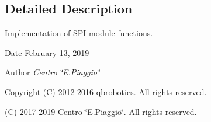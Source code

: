 \subsection{Detailed Description}
Implementation of S\+PI module functions. 

\begin{DoxyDate}{Date}
February 13, 2019 
\end{DoxyDate}
\begin{DoxyAuthor}{Author}
{\itshape Centro \char`\"{}\+E.\+Piaggio\char`\"{}} 
\end{DoxyAuthor}
\begin{DoxyCopyright}{Copyright}
(C) 2012-\/2016 qbrobotics. All rights reserved. 

(C) 2017-\/2019 Centro \char`\"{}\+E.\+Piaggio\char`\"{}. All rights reserved. 
\end{DoxyCopyright}
